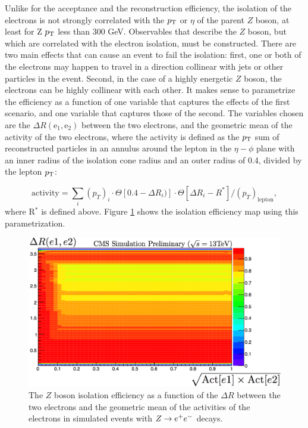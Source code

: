 {Unlike for the acceptance and the reconstruction efficiency, the isolation of the electrons is not strongly correlated with the $p_{\text{T}}$ or $\eta$ of the parent $Z$ boson, at least for Z $p_{\text{T}}$ less than 300 GeV. Observables that describe the $Z$ boson, but which are correlated with the electron isolation, must be constructed. There are two main effects that can cause an event to fail the isolation: first, one or both of the electrons may happen to travel in a direction collinear with jets or other particles in the event. Second, in the case of a highly energetic $Z$ boson, the electrons can be highly collinear with each other. It makes sense to parametrize the efficiency as a function of one variable that captures the effects of the first scenario, and one variable that captures those of the second. The variables chosen are the $\Delta R (\text{e}_1, \text{e}_2)$ between the two electrons, and the geometric mean of the activity of the two electrons, where the activity is defined as the $p_{\text{T}}$ sum of reconstructed particles in an annulus around the lepton in the $\eta-\phi$ plane with an inner radius of the isolation cone radius and an outer radius of 0.4, divided by the lepton $p_{\text{T}}$:

\begin{equation}
\text{activity} = \sum_{i}(p_{T})_i \cdot \Theta[0.4-\Delta R_{i})] \cdot \Theta[\Delta R_{i}-R^*]/(p_T)_{\text{lepton}},
\end{equation}
where R$^*$ is defined above.
Figure \ref{fig:ZeeIsolation} shows the isolation efficiency map using this parametrization. 
\begin{figure}[tb!]
\centering
\includegraphics[width=0.7\linewidth]{figures/SusySearches/HadStop2015/ZeeIsolation.png}
\caption{The $Z$ boson isolation efficiency as a function of the $\Delta R$ between the two electrons and the geometric mean of the activities of the electrons in simulated events with $Z\rightarrow e^+e^-$ decays.}
\label{fig:ZeeIsolation}
\end{figure}
\FloatBarrier

}
